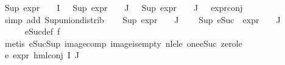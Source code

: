 \begin{isabellebody}
\ {\isacartoucheopen}Sup\ {\isacharparenleft}{\kern0pt}{\isacharparenleft}{\kern0pt}expr{\isacharunderscore}{\kern0pt}{}\ {\isasymcirc}\ {\isasymPhi}{\isacharparenright}{\kern0pt}\ {\isacharbackquote}{\kern0pt}\ I{\isacharparenright}{\kern0pt}\ {\isasymle}\ {}{\isacartoucheclose}\ {\isacartoucheopen}Sup\ {\isacharparenleft}{\kern0pt}{\isacharparenleft}{\kern0pt}expr{\isacharunderscore}{\kern0pt}{}\ {\isasymcirc}\ {\isasymPhi}{\isacharparenright}{\kern0pt}\ {\isacharbackquote}{\kern0pt}\ J{\isacharparenright}{\kern0pt}\ {\isasymle}\ {}{\isacartoucheclose}\ {\isacartoucheopen}Sup\ {\isacharparenleft}{\kern0pt}{\isacharparenleft}{\kern0pt}expr{\isacharunderscore}{\kern0pt}{}\ {\isasymcirc}\ {\isasymPhi}{\isacharparenright}{\kern0pt}\ {\isacharbackquote}{\kern0pt}\ J{\isacharparenright}{\kern0pt}\ {\isasymle}\ {}{\isacartoucheclose}\ expr{\isacharunderscore}{\kern0pt}{}{\isacharunderscore}{\kern0pt}conj\ \isanewline
\ \ \ \ \isamarkupfalse%
\ {\isacharparenleft}{\kern0pt}simp\ add{\isacharcolon}{\kern0pt}\ Sup{\isacharunderscore}{\kern0pt}union{\isacharunderscore}{\kern0pt}distrib{\isacharparenright}{\kern0pt}\isanewline
\ \ \isamarkupfalse%
\ {\isacartoucheopen}Sup\ {\isacharparenleft}{\kern0pt}{\isacharparenleft}{\kern0pt}expr{\isacharunderscore}{\kern0pt}{}\ {\isasymcirc}\ {\isasymPhi}{\isacharparenright}{\kern0pt}\ {\isacharbackquote}{\kern0pt}\ J{\isacharparenright}{\kern0pt}\ {\isasymle}\ {}{\isacartoucheclose}\ \isamarkupfalse%
\ {\isachardoublequoteopen}Sup\ {\isacharparenleft}{\kern0pt}{\isacharparenleft}{\kern0pt}eSuc\ {\isasymcirc}\ expr{\isacharunderscore}{\kern0pt}{}\ {\isasymcirc}\ {\isasymPhi}{\isacharparenright}{\kern0pt}\ {\isacharbackquote}{\kern0pt}\ J{\isacharparenright}{\kern0pt}\ {\isasymle}\ {}{\isachardoublequoteclose}\isanewline
\ \ \ \ \isamarkupfalse%
\ eSuc{\isacharunderscore}{\kern0pt}def\ f{}{\isacharparenleft}{\kern0pt}{}{\isacharparenright}{\kern0pt}\isanewline
\ \ \ \ \isamarkupfalse%
\ {\isacharparenleft}{\kern0pt}metis\ eSuc{\isacharunderscore}{\kern0pt}Sup\ image{\isacharunderscore}{\kern0pt}comp\ image{\isacharunderscore}{\kern0pt}is{\isacharunderscore}{\kern0pt}empty\ nle{\isacharunderscore}{\kern0pt}le\ one{\isacharunderscore}{\kern0pt}eSuc\ zero{\isacharunderscore}{\kern0pt}le{\isacharparenright}{\kern0pt}\ \isanewline
\ \ \ \ \isamarkupfalse%
\ e{}{\isacharcolon}{\kern0pt}\ {\isachardoublequoteopen}expr{\isacharunderscore}{\kern0pt}{}\ {\isacharparenleft}{\kern0pt}hml{\isacharunderscore}{\kern0pt}conj\ I\ J\ {\isasymPhi}{\isacharparenright}{\kern0pt}\ {\isasymle}\ {}{\isachardoublequoteclose}\isanewline

\end{isabellebody}
